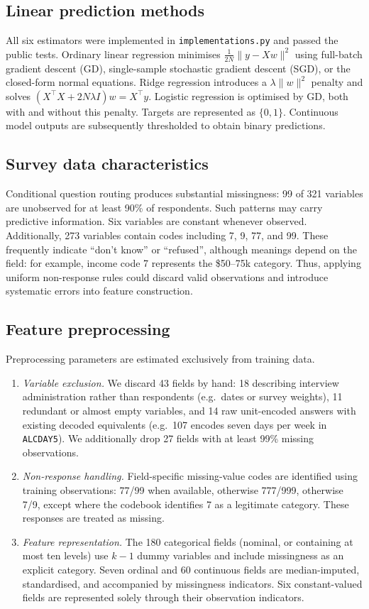 \documentclass[10pt,conference]{IEEEtran}
\begin{document}
\subsection{Linear prediction methods}
All six estimators were implemented in \texttt{implementations.py} and
passed the public tests. Ordinary linear regression minimises
$\frac{1}{2N}\|y-Xw\|^2$ using full-batch gradient descent (GD),
single-sample stochastic gradient descent (SGD), or the closed-form
normal equations. Ridge regression introduces a $\lambda\|w\|^2$
penalty and solves $(X^\top X+2N\lambda I)w=X^\top y$. Logistic
regression is optimised by GD, both with and without this penalty.
Targets are represented as $\{0,1\}$. Continuous model outputs are
subsequently thresholded to obtain binary predictions.

\subsection{Survey data characteristics}
Conditional question routing produces substantial missingness: 99 of 321
variables are unobserved for at least 90\% of respondents. Such patterns
may carry predictive information. Six variables are constant whenever
observed. Additionally, 273 variables contain
codes including 7, 9, 77, and 99. These frequently indicate
``don't know'' or ``refused'', although meanings depend on the field:
for example, income code 7 represents the \$50--75k category.
Thus, applying uniform non-response rules could discard valid
observations and introduce systematic errors into feature construction.

\subsection{Feature preprocessing}
Preprocessing parameters are estimated exclusively from training data.
\begin{enumerate}
\item \emph{Variable exclusion.} We discard 43 fields by hand: 18 describing interview administration
rather than respondents (e.g.\ dates or survey weights), 11 redundant
or almost empty variables, and 14 raw unit-encoded answers with
existing decoded equivalents (e.g.\ 107 encodes seven days per week in
\texttt{ALCDAY5}). We additionally drop 27 fields with at least 99\%
missing observations.
\item \emph{Non-response handling.} Field-specific missing-value codes
are identified using training observations: 77/99 when available,
otherwise 777/999, otherwise 7/9, except where the codebook identifies
7 as a legitimate category. These responses are treated as missing.
\item \emph{Feature representation.} The 180 categorical fields
(nominal, or containing at most ten levels) use $k-1$ dummy variables
and include missingness as an explicit category. Seven ordinal and
60 continuous fields are median-imputed, standardised, and accompanied
by missingness indicators. Six constant-valued fields are represented
solely through their observation indicators.
\end{enumerate}
\end{document}

